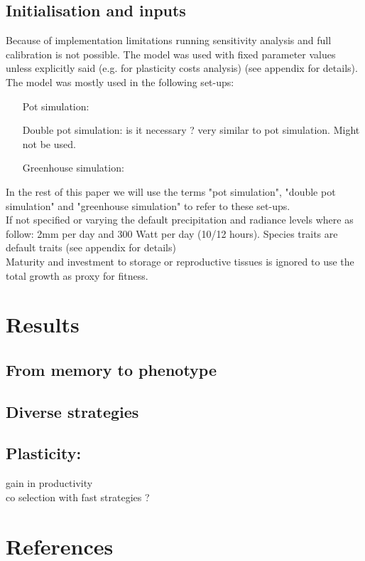 \documentclass[review]{elsarticle}
\begin{document}
\subsection{Initialisation and inputs}
Because of implementation limitations running sensitivity analysis and full calibration is not possible. The model was used with fixed parameter values unless explicitly said (e.g. for plasticity costs analysis) (see appendix for details). The model was mostly used in the following set-ups:
\begin{itemize}
\item[Pot simulation:]
\item[Double pot simulation:] is it necessary ? very similar to pot simulation. Might not be used.
\item[Greenhouse simulation:]
\end{itemize}
In the rest of this paper we will use the terms "pot simulation", "double pot simulation" and "greenhouse simulation" to refer  to these set-ups.\\
If not specified or varying the default precipitation and radiance levels where as follow: 2mm per day and 300 Watt per day (10/12 hours). Species traits are default traits (see appendix for details)\\
Maturity and investment to storage or reproductive tissues is ignored to use the total growth as proxy for fitness.


\section{Results}
\subsection{From memory to phenotype}
\subsection{Diverse strategies}

\subsection{Plasticity: }
gain in productivity\\
co selection with fast strategies ?


\section*{References}
\cite{Dirac1953888}

\end{document}
